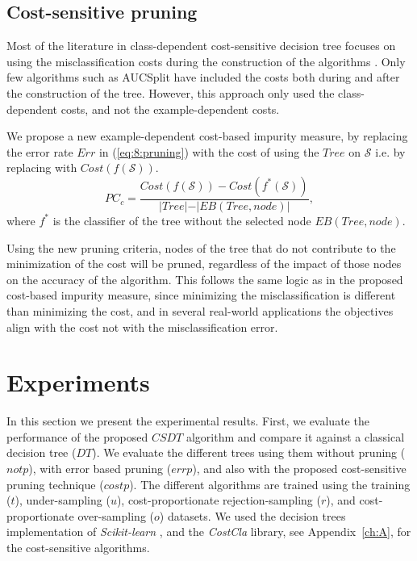 	\subsection{Cost-sensitive pruning}
 
		Most of the literature in class-dependent cost-sensitive decision tree focuses on using the 
		misclassification costs during the construction of the algorithms \citep{Lomax2013}. Only few 
		algorithms such as AUCSplit \citep{Ferri2002} have \mbox{included} the costs both during and 
		after the construction of the tree. However, this approach only used the class-dependent costs, 
		and not the example-dependent costs.
 
		We propose a new example-dependent cost-based impurity measure, by replacing the error rate 
		$Err$ in (\ref{eq:8:pruning}) with the cost of using the $Tree$ on $\mathcal{S}$ i.e. by 
    replacing with 	$Cost(f(\mathcal{S}))$.
		\begin{equation}\label{eq:8:cost_pruning}
			PC_{c} = \frac{ Cost(f(\mathcal{S})) - Cost(f^*(\mathcal{S})) }
		  {\vert Tree\vert-\vert EB(Tree,node)\vert} ,
		\end{equation}
		where $f^*$ is the classifier of the tree without the selected node $EB(Tree,node)$.
 
		Using the new pruning criteria, nodes of the tree that do not contribute to the minimization of 
		the cost will be pruned, regardless of the impact of those nodes on the accuracy of the
		algorithm. This follows the same logic as in the proposed cost-based impurity measure, since 
		minimizing the misclassification is different than minimizing the cost, and in several 
		real-world applications the objectives align with the cost not with the misclassification error.
		
\section{Experiments}
\label{sec:8:experiments}

In this section we present the experimental results. First, we evaluate the performance of the 
proposed $CSDT$ algorithm and compare it against a classical decision tree ($DT$). We evaluate 
the different trees using them without pruning ($not p$), with error based pruning ($err p$), 
and also with the proposed cost-sensitive pruning technique ($cost p$). The different algorithms 
are trained using the training ($t$), under-sampling ($u$), cost-proportionate rejection-sampling 
($r$), and cost-proportionate over-sampling ($o$) datasets. We used the decision trees 
implementation of \textit{Scikit-learn} \citep{Pedregosa2011}, and the \textit{CostCla} library, see 
Appendix~\ref{ch:A}, for the cost-sensitive algorithms.

